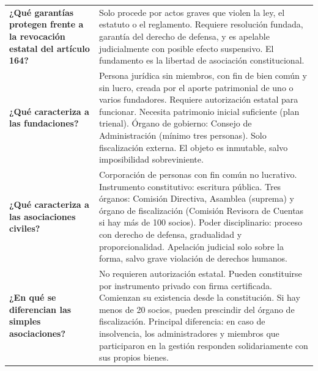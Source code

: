 \documentclass[12pt,oneside]{book}
\begin{document}
\begin{longtable}{
    >{\raggedright\arraybackslash}p{}
    >{\raggedright\arraybackslash}p{}
}
\textbf{¿Qué garantías protegen frente a la revocación estatal del artículo 164?} &
Solo procede por actos graves que violen la ley, el estatuto o el reglamento. Requiere resolución fundada, garantía del derecho de defensa, y es apelable judicialmente con posible efecto suspensivo. El fundamento es la libertad de asociación constitucional. \\[0.4em]

\textbf{¿Qué caracteriza a las fundaciones?} &
Persona jurídica sin miembros, con fin de bien común y sin lucro, creada por el aporte patrimonial de uno o varios fundadores. Requiere autorización estatal para funcionar. Necesita patrimonio inicial suficiente (plan trienal). Órgano de gobierno: Consejo de Administración (mínimo tres personas). Solo fiscalización externa. El objeto es inmutable, salvo imposibilidad sobreviniente. \\[0.4em]

\textbf{¿Qué caracteriza a las asociaciones civiles?} &
Corporación de personas con fin común no lucrativo. Instrumento constitutivo: escritura pública. Tres órganos: Comisión Directiva, Asamblea (suprema) y órgano de fiscalización (Comisión Revisora de Cuentas si hay más de 100 socios). Poder disciplinario: proceso con derecho de defensa, gradualidad y proporcionalidad. Apelación judicial solo sobre la forma, salvo grave violación de derechos humanos. \\[0.4em]

\textbf{¿En qué se diferencian las simples asociaciones?} &
No requieren autorización estatal. Pueden constituirse por instrumento privado con firma certificada. Comienzan su existencia desde la constitución. Si hay menos de 20 socios, pueden prescindir del órgano de fiscalización. Principal diferencia: en caso de insolvencia, los administradores y miembros que participaron en la gestión responden solidariamente con sus propios bienes. \\[0.4em]


\end{longtable}
\end{document}
